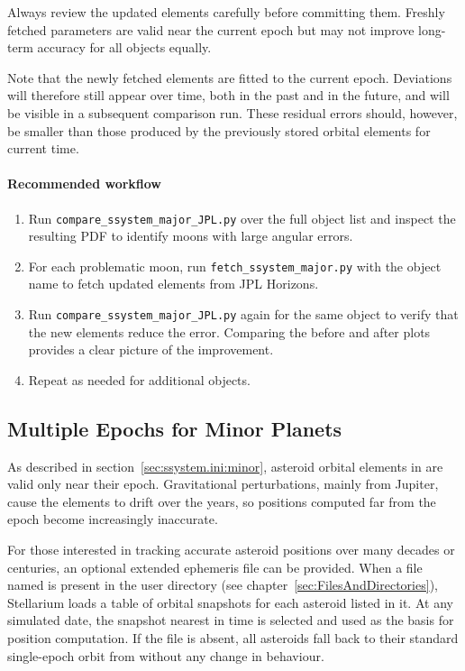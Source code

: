 Always review the updated elements carefully before committing them. Freshly fetched
parameters are valid near the current epoch but may not improve long-term accuracy for
all objects equally.

Note that the newly fetched elements are fitted to the current epoch. Deviations will
therefore still appear over time, both in the past and in the future, and will be visible
in a subsequent comparison run. These residual errors should, however, be smaller than
those produced by the previously stored orbital elements for current time.

\paragraph{Recommended workflow}

\begin{enumerate}
  \item Run \texttt{compare\_ssystem\_major\_JPL.py} over the full object list and inspect
        the resulting PDF to identify moons with large angular errors.
  \item For each problematic moon, run \texttt{fetch\_ssystem\_major.py} with the object
        name to fetch updated elements from JPL Horizons.
  \item Run \texttt{compare\_ssystem\_major\_JPL.py} again for the same object to verify
        that the new elements reduce the error. Comparing the before and after plots
        provides a clear picture of the improvement.
  \item Repeat as needed for additional objects.
\end{enumerate}


\subsection{Multiple Epochs for Minor Planets}
\label{sec:ssystem.ini:MultiEpoch}
 
As described in section~\ref{sec:ssystem.ini:minor}, asteroid orbital
elements in  are valid only near their epoch.
Gravitational perturbations, mainly from Jupiter, cause the elements to
drift over the years, so positions computed far from the epoch become
increasingly inaccurate.
 
For those interested in tracking accurate asteroid positions over many
decades or centuries, an optional extended ephemeris file can be
provided.  When a file named  is present
in the user  directory (see
chapter~\ref{sec:FilesAndDirectories}), Stellarium loads a table of
orbital snapshots for each asteroid listed in it.  At any simulated
date, the snapshot nearest in time is selected and used as the basis for
position computation.  If the file is absent, all asteroids fall back to
their standard single-epoch orbit from 
without any change in behaviour.
 
